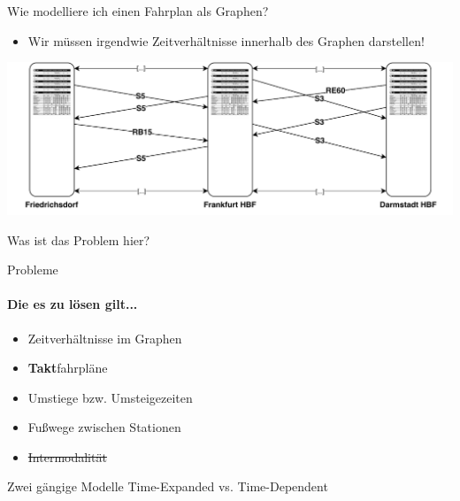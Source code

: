 \begin{frame}{Wie modelliere ich einen Fahrplan als Graphen?}
	\begin{itemize}
		\item Wir müssen irgendwie Zeitverhältnisse innerhalb des Graphen darstellen!
	\end{itemize}
	
	\begin{center}
		\includegraphics[width=\linewidth]{images/simple-approach-timed.pdf}
	\end{center}

	\begin{block}{}
		Was ist das Problem hier?
	\end{block}
\end{frame}

%	
%

\begin{frame}{Probleme}
	\framesubtitle{Die es zu lösen gilt...}
	\begin{itemize}
		\item Zeitverhältnisse im Graphen \pause
		\item \textbf{Takt}fahrpläne \pause
		\item Umstiege bzw. Umsteigezeiten \pause		
		\item Fußwege zwischen Stationen \pause
		\item \sout{Intermodalität}
	\end{itemize}
	
	\vspace{6em}
	\begin{block}{Zwei gängige Modelle}
		Time-Expanded vs. Time-Dependent
	\end{block}
\end{frame}




















